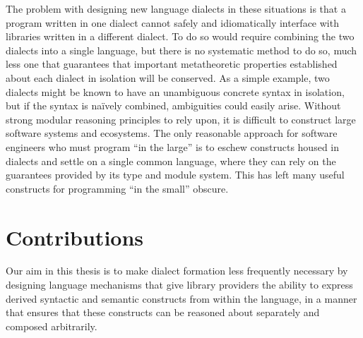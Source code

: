 The problem with designing new language dialects in these situations is that a program written in one dialect cannot safely and idiomatically interface with libraries written in a different dialect. %
To do so would require combining the two dialects into a single language, but there is no systematic method to do so, much less one that guarantees that important metatheoretic properties established about each dialect in isolation will be conserved. As a simple example, two dialects might be known to have an unambiguous concrete syntax in isolation, but if the syntax is na\"ively combined, ambiguities could easily arise. %
Without strong modular reasoning principles to rely upon, it is difficult to construct large software systems and ecosystems. 
The only reasonable approach for software engineers who must program ``in the large'' is to eschew constructs housed in dialects and settle on a single common language, where they can  rely on the guarantees provided by its type and module system. %
This has left many useful constructs for programming ``in the small'' obscure.%

\section{Contributions}
Our aim in this thesis is to make dialect formation less frequently necessary by designing language mechanisms that give library providers the ability to express derived syntactic and semantic constructs from within the language, in a manner that ensures that these constructs can be reasoned about separately and composed arbitrarily. 

